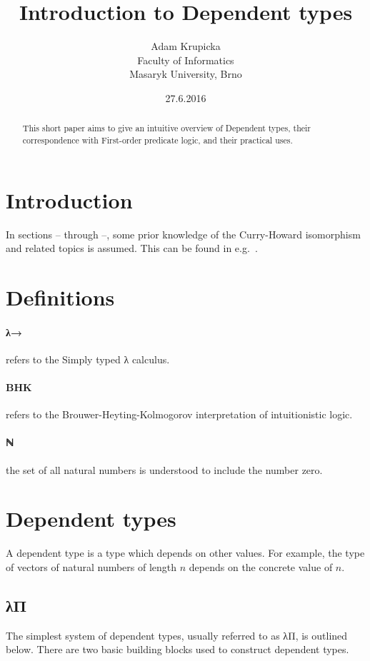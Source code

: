 \documentclass[12pt]{article}
\title{Introduction to Dependent types}
\author{Adam Krupicka\\
        Faculty of Informatics\\
        Masaryk University, Brno
}
\date{27.6.2016}
\begin{document}
\maketitle

\begin{abstract}
This short paper aims to give an intuitive overview of Dependent types, their correspondence with First-order predicate logic, and their practical uses.
\end{abstract} 

\section{Introduction}
In sections – through –, some prior knowledge of the Curry-Howard isomorphism and related topics is assumed. This can be found in e.g.~\cite{mcadams2013tutorial}.

\section{Definitions}
\paragraph{λ→} refers to the Simply typed λ calculus.

\paragraph{BHK} refers to the Brouwer-Heyting-Kolmogorov interpretation of intuitionistic logic.

\paragraph{ℕ} the set of all natural numbers is understood to include the number zero.

\newpage

\section{Dependent types}
A dependent type is a type which depends on other values. For example, the type of vectors of natural numbers of length $n$ depends on the concrete value of $n$.
\subsection{λΠ}
The simplest system of dependent types, usually referred to as λΠ, is outlined below. There are two basic building blocks used to construct dependent types.
\end{document}
